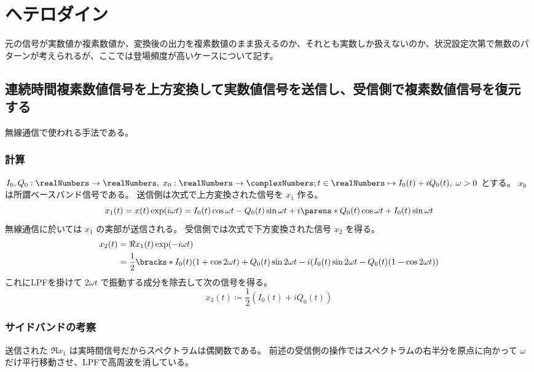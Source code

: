 \chapter{ヘテロダイン}
    元の信号が実数値か複素数値か、変換後の出力を複素数値のまま扱えるのか、それとも実数しか扱えないのか、状況設定次第で無数のパターンが考えられるが、ここでは登場頻度が高いケースについて記す。
    \section{連続時間複素数値信号を上方変換して実数値信号を送信し、受信側で複素数値信号を復元する}
        無線通信で使われる手法である。
        \subsection{計算}
            $I_0, Q_0:\realNumbers\to\realNumbers,\;x_0:\realNumbers\to\complexNumbers; t\in\realNumbers\mapsto I_0(t) + iQ_0(t),\;\omega > 0$ とする。
            $x_0$ は所謂ベースバンド信号である。
            送信側は次式で上方変換された信号を $x_1$ 作る。
            \[ x_1(t) = x(t)\exp(i\omega t) = I_0(t)\cos\omega t - Q_0(t)\sin\omega t + i\parens*{Q_0(t)\cos\omega t + I_0(t)\sin\omega t} \]
            無線通信に於いては $x_1$ の実部が送信される。
            受信側では次式で下方変換された信号 $x_2$ を得る。
            \begin{align*}
                x_2(t) &= \Re{x_1(t)}\exp(-i\omega t) \\
                &= \frac{1}{2}\bracks*{I_0(t)(1+\cos 2\omega t) + Q_0(t)\sin 2\omega t - i(I_0(t)\sin 2\omega t - Q_0(t)(1-\cos 2\omega t))}
            \end{align*}
            これにLPFを掛けて $2\omega t$ で振動する成分を除去して次の信号を得る。
            \[ x_3(t) \coloneqq \frac{1}{2}(I_0(t) + iQ_0(t)) \]
        \subsection{サイドバンドの考察}
            送信された $\Re{x_1}$ は実時間信号だからスペクトラムは偶関数である。
            前述の受信側の操作ではスペクトラムの右半分を原点に向かって $\omega$ だけ平行移動させ、LPFで高周波を消している。
